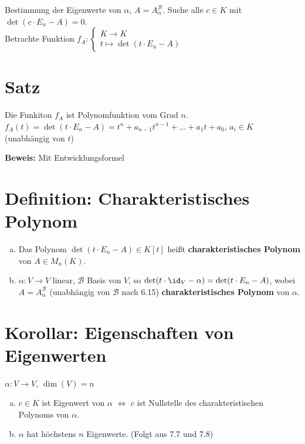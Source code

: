   Bestimmung der Eigenwerte von $\alpha$, $A=A_\alpha^{\mathcal{B}}$. Suche alle $c\in
  K$ mit $\det(c\cdot E_n-A)=0$.\\
  Betrachte Funktion $f_A:\begin{cases}K\rightarrow K\\t\mapsto\det(t\cdot
  E_n-A)\end{cases}$

\section{Satz}
  Die Funkiton $f_A$ ist Polynomfunktion vom Grad $n$.\\
  $f_A(t)=\det(t\cdot E_n-A)=t^n+a_{n-1}t^{n-1}+...+a_1t+a_0$, $a_i\in K$
  (unabhängig von $t$)

  \textbf{Beweis:} Mit Entwicklungsformel

\section{Definition: Charakteristisches Polynom}
  \begin{enumerate}[a)]
    \item Das Polynom $\det(t\cdot E_n-A)\in K[t]$ heißt
      \textbf{charakteristisches Polynom} von $A\in M_n(K)$.
    \item $\alpha:V\rightarrow V$ linear, $\mathcal{B}$ Basis von $V$, so
      $\det(t\cdot\id_V-\alpha)=\det(t\cdot E_n-A)$, wobei
      $A=A_\alpha^{\mathcal{B}}$ (unabhängig von ${\mathcal{B}}$ nach 6.15)
      \textbf{charakteristisches Polynom} von $\alpha$.
  \end{enumerate}

\section{Korollar: Eigenschaften von Eigenwerten}
  $\alpha:V\rightarrow V$, $\dim(V)=n$
  \begin{enumerate}[a)]
    \item $c\in K$ ist Eigenwert von $\alpha$ $\Leftrightarrow$ $c$ ist
      Nullstelle des charakteristischen Polynoms von $\alpha$.
    \item $\alpha$ hat höchstens $n$ Eigenwerte. (Folgt aus 7.7 und 7.8)
  \end{enumerate}

